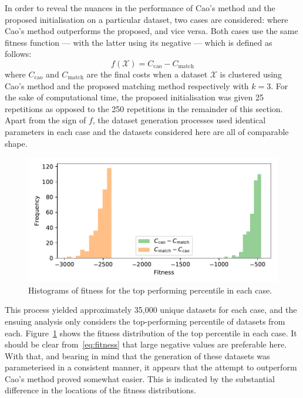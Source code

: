 \documentclass[smallextended]{svjour3}
\newcommand{\imgwidth}{.85\textwidth}
\begin{document}
In order to reveal the nuances in the performance of Cao's method and the
proposed initialisation on a particular dataset, two cases are considered:
where Cao's method outperforms the proposed, and vice versa. Both cases use the
same fitness function --- with the latter using its negative --- which is
defined as follows:
\begin{equation}\label{eq:fitness}
    f\left(\mathcal X\right) = C_{\mathrm{cao}} - C_{\mathrm{match}}
\end{equation}
where \(C_{\mathrm{cao}}\) and \(C_{\mathrm{match}}\) are the final costs when a
dataset \(\mathcal X\) is clustered using Cao's method and the proposed matching
method respectively with \(k = 3\). For the sake of computational time, the
proposed initialisation was given 25 repetitions as opposed to the 250
repetitions in the remainder of this section. Apart from the sign of \(f\), the
dataset generation processes used identical parameters in each case and the
datasets considered here are all of comparable shape.

\begin{figure}
    \centering
    \includegraphics[width=\imgwidth]{Fig9.pdf}
    \caption{Histograms of fitness for the top performing percentile in each
             case.}\label{fig:fitness}
\end{figure}

This process yielded approximately 35,000 unique datasets for each case, and the
ensuing analysis only considers the top-performing percentile of datasets from
each. Figure~\ref{fig:fitness} shows the fitness distribution of the top
percentile in each case. It should be clear from~\eqref{eq:fitness} that large
negative values are preferable here. With that, and bearing in mind that the
generation of these datasets was parameterised in a consistent manner, it
appears that the attempt to outperform Cao's method proved somewhat easier. This
is indicated by the substantial difference in the locations of the fitness
distributions.
\end{document}
